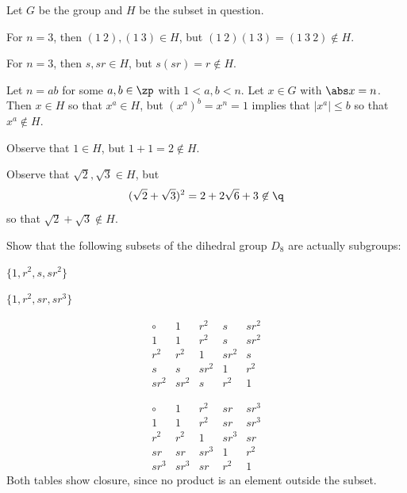 \begin{sol}
    Let $G$ be the group and $H$ be the subset in question.
    \begin{subproblems}
        \item For $n = 3$, then $(1\ 2), (1\ 3) \in H$, but $(1\ 2)(1\ 3) = (1\ 3\ 2) \not\in H$.
        \item For $n = 3$, then $s, sr \in H$, but $s(sr) = r \not\in H$.
        \item Let $n = ab$ for some $a, b \in \zp$ with $1 < a, b < n$. Let $x \in G$ with $\abs x = n$. Then $x \in H$ so that $x^a \in H$, but $(x^a)^b = x^n = 1$ implies that $|x^a| \leq b$ so that $x^a \not\in H$.
        \item Observe that $1 \in H$, but $1 + 1 = 2 \not\in H$.
        \item Observe that $\sqrt 2, \sqrt 3 \in H$, but
        \[(\sqrt 2 + \sqrt 3)^2 = 2 + 2\sqrt 6 + 3 \not\in \q\]
        so that $\sqrt 2 + \sqrt 3 \not\in H$. \qh
    \end{subproblems}
\end{sol}

\begin{exercise}\label{ex2.1.3}
    Show that the following subsets of the dihedral group $D_8$ are actually subgroups:
    \begin{subproblems}
        \item $\{1, r^2, s, sr^2\}$
        \item $\{1, r^2, sr, sr^3\}$
    \end{subproblems}
\end{exercise}

\begin{solalph}
    \item 
    \[
    \begin{array}{c|cccc}
        \circ & 1 & r^2 & s & sr^2 \\
        \hline
        1 & 1 & r^2 & s & sr^2 \\
        r^2 & r^2 & 1 & sr^2 & s \\
        s & s & sr^2 & 1 & r^2 \\
        sr^2 & sr^2 & s & r^2 & 1
    \end{array}
    \]
    \item 
    \[
    \begin{array}{c|cccc}
        \circ & 1 & r^2 & sr & sr^3 \\
        \hline
        1 & 1 & r^2 & sr & sr^3 \\
        r^2 & r^2 & 1 & sr^3 & sr \\
        sr & sr & sr^3 & 1 & r^2 \\
        sr^3 & sr^3 & sr & r^2 & 1
    \end{array}
    \]
    Both tables show closure, since no product is an element outside the subset.
\end{solalph}

